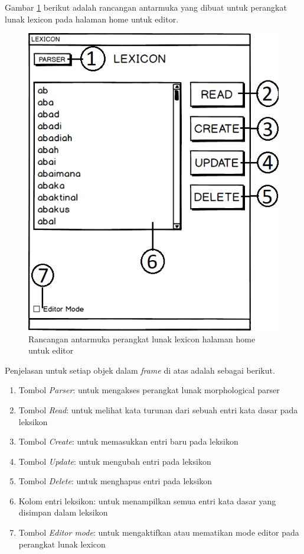 Gambar \ref{mockup-lexicon-home-editor} berikut adalah rancangan antarmuka yang dibuat untuk perangkat lunak lexicon pada halaman home untuk editor.

\begin{figure}[H]
\centering
\includegraphics[scale=0.8]{Gambar/mockup-lexicon-home-editor}
\caption{Rancangan antarmuka perangkat lunak lexicon halaman home untuk editor} 
\label{mockup-lexicon-home-editor}
\end{figure}

Penjelasan untuk setiap objek dalam \textit{frame} di atas adalah sebagai berikut.

\begin{enumerate}
	\item Tombol \textit{Parser}: untuk mengakses perangkat lunak morphological parser
	\item Tombol \textit{Read}: untuk melihat kata turunan dari sebuah entri kata dasar pada leksikon
	\item Tombol \textit{Create}: untuk memasukkan entri baru pada leksikon
	\item Tombol \textit{Update}: untuk mengubah entri pada leksikon
	\item Tombol \textit{Delete}: untuk menghapus entri pada leksikon
	\item Kolom entri leksikon: untuk menampilkan semua entri kata dasar yang disimpan dalam leksikon
	\item Tombol \textit{Editor mode}: untuk mengaktifkan atau mematikan mode editor pada perangkat lunak lexicon
\end{enumerate}

